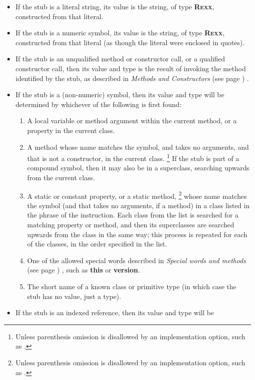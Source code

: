 \begin{itemize}
\item 
If the stub is a literal string, its value is the string, of
type \textbf{R\textsc{exx}}, constructed from that literal.
\item 
If the stub is a numeric symbol, its value is the string, of
type \textbf{R\textsc{exx}}, constructed from that literal (as though the
literal were enclosed in quotes).
\item 
If the stub is an unqualified method or constructor call, or a
qualified constructor call, then its value and type is the result of
invoking the method identified by the stub, as described in
 \emph{Methods and Constructors} (see page \pageref{refmethcon}) .
\item 
If the stub is a (non-numeric) symbol, then its value and type will be
determined by whichever of the following is first found:
\begin{enumerate}
\item A local variable or method argument within the current method, or a
property in the current class.
\item A method whose name matches the symbol, and takes no arguments, and
that is not a constructor, in the current class.
\footnote{
Unless parenthesis omission is disallowed by an implementation option,
such as .
}
If the stub is part of a compound symbol, then it may also be in a
superclass, searching upwards from the current class.
\item A static or constant property, or a static method,
\footnote{
Unless parenthesis omission is disallowed by an implementation option,
such as .
}
whose name matches the symbol (and that takes no arguments, if a method)
in a class listed in the  phrase of the 
instruction.
Each class from the list is searched for a matching property or method, and
then its superclasses are searched upwards from the class in the same
way; this process is repeated for each of the classes, in the order
specified in the list.
\item One of the allowed special words described in
 \emph{Special words and methods} (see page \pageref{refspecial}) , such
as \textbf{this} or \textbf{version}.
\item The short name of a known class or primitive type (in which
case the stub has no value, just a type).
\end{enumerate}
\item 
If the stub is an indexed reference, then its value and type will be

\end{itemize}
